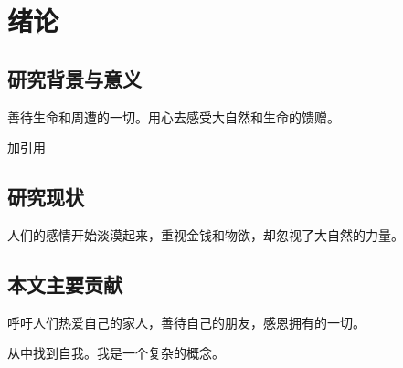 \chapter{绪论}
\label{ch:structure}

\section{研究背景与意义}

善待生命和周遭的一切。用心去感受大自然和生命的馈赠。

加引用\cite{hinton2012deep}

\section{研究现状}

人们的感情开始淡漠起来，重视金钱和物欲，却忽视了大自然的力量。

\section{本文主要贡献}

呼吁人们热爱自己的家人，善待自己的朋友，感恩拥有的一切。

从中找到自我。我是一个复杂的概念。